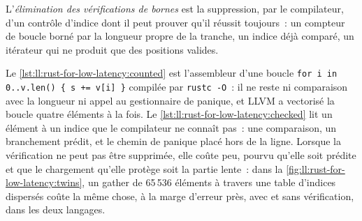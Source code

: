 \begin{definition}\label{def:ll:rust-for-low-latency:bce}
L'\emph{élimination des vérifications de bornes} est la suppression, par le compilateur,
d'un contrôle d'indice dont il peut prouver qu'il réussit toujours~: un compteur de boucle borné par la longueur propre de la tranche, un
indice déjà comparé, un itérateur qui ne produit que des positions valides.
\end{definition}

Le \cref{lst:ll:rust-for-low-latency:counted} est l'assembleur d'une boucle \texttt{for i in 0..v.len() \{ s += v[i] \}} compilée
par \texttt{rustc -O}~: il ne reste ni comparaison avec la longueur ni appel au gestionnaire de panique, et LLVM a vectorisé la
boucle quatre éléments à la fois. Le \cref{lst:ll:rust-for-low-latency:checked} lit un élément à un indice que le compilateur ne
connaît pas~: une comparaison, un branchement prédit, et le chemin de panique placé hors de la ligne. Lorsque la vérification ne peut
pas être supprimée, elle coûte peu, pourvu qu'elle soit prédite et que le chargement qu'elle protège soit la partie lente~: dans la
\cref{fig:ll:rust-for-low-latency:twins}, un gather de 65\,536 éléments à travers une table d'indices dispersés coûte la même
chose, à la marge d'erreur près, avec et sans vérification, dans les deux langages.

\label{lst:ll:rust-for-low-latency:counted}

\label{lst:ll:rust-for-low-latency:checked}


